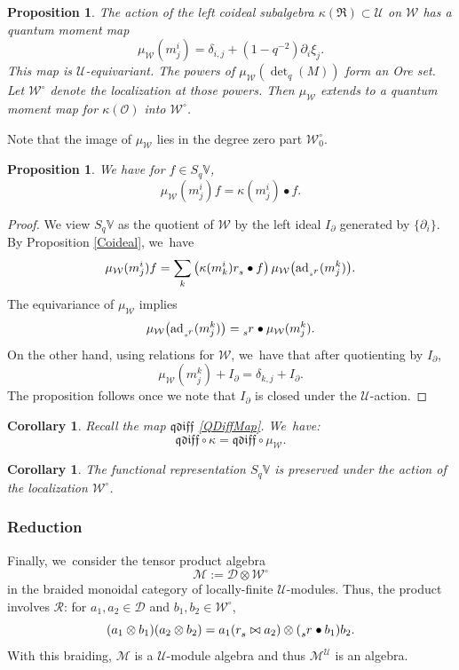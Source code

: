 \documentclass[11pt]{article}
\newtheorem{prop}[thm]{Proposition}
\newtheorem{cor}[thm]{Corollary}
\theoremstyle{definition}
\newcommand{\OO}{\mathcal{O}}
\newcommand{\UU}{\mathcal{U}}
\newcommand{\DD}{\mathcal{D}}
\newcommand{\WW}{\mathcal{W}}
\newcommand{\WWo}{\WW^\circ}
\newcommand{\MM}{\mathcal{M}}
\newcommand{\del}{\partial}
\newcommand{\ad}{\mathrm{ad}}
\begin{document}
\begin{prop}
The action of the left coideal subalgebra $\kappa(\mathfrak{R})\subset\UU$ on $\WW$ has a quantum moment map
\[
\mu_\WW(m^i_j)= \delta_{i,j}+(1-q^{-2})\del_i\xi_j.
\]
This map is $\UU$-equivariant.
The powers of $\mu_\WW(\det_q(M))$ form an Ore set.
Let $\WWo$ denote the localization at those powers.
Then $\mu_\WW$ extends to a quantum moment map for $\kappa(\OO)$ into $\WWo$.
\end{prop}

Note that the image of $\mu_\WW$ lies in the degree zero part $\WWo_0$.

\begin{prop}\label{WBasic}
We have for $f\in S_q\mathbb{V}$,
\[
\mu_\WW(m^i_j) f=\kappa(m^i_j)\bullet f.
\]
\end{prop}

\begin{proof}
We view $S_q\mathbb{V}$ as the quotient of $\WW$ by the left ideal $I_\del$ generated by $\{ \del_i\}$.
By Proposition \ref{Coideal}, we~have
\[
\mu_\WW(m^i_j)f=\sum_{k}\left(\kappa(m^i_k)\tensor[]{r}{_s} \bullet f\right)\mu_\WW\big(\ad_{\tensor[_s]{r}{}}(m^k_{j})\big).
\]
The equivariance of $\mu_\WW$ implies
\[
\mu_\WW\big(\ad_{\tensor[_s]{r}{}}(m^k_{j})\big)=\tensor[_s]{r}{}\bullet\mu_\WW(m^k_j).
\]
On the other hand, using relations for $\WW$, we~have that after quotienting by $I_\del$,
\[
\mu_\WW(m^k_j) +I_\del=\delta_{k,j}+I_\del.
\]
The proposition follows once we note that $I_\del$ is closed under the $\UU$-action.
\end{proof}

\begin{cor}\label{QDiffMoment}
Recall the map $\mathfrak{qdiff}$ \eqref{QDiffMap}. We~have:
\[
\mathfrak{qdiff}\circ\kappa = \mathfrak{qdiff}\circ\mu_\WW.
\]
\end{cor}

\begin{cor}
The functional representation $S_q\mathbb{V}$ is preserved under the action of the localization $\WWo$.
\end{cor}

\subsubsection{Reduction}\label{Reduct}
Finally, we~consider the tensor product algebra
\[
\MM:=\DD\otimes\WWo
\]
in the braided monoidal category of locally-finite $\UU$-modules.
Thus, the product involves $\mathcal{R}$: for $a_1,a_2\in\DD$ and $b_1,b_2\in\WWo$,
\[
(a_1\otimes b_1)(a_2\otimes b_2)=a_1(\tensor[]{r}{_s}\bowtie a_2)\otimes (\tensor[_s]{r}{}\bullet b_1)b_2.
\]
With this braiding, $\MM$ is a $\UU$-module algebra and thus $\MM^\UU$ is an algebra.
\end{document}
